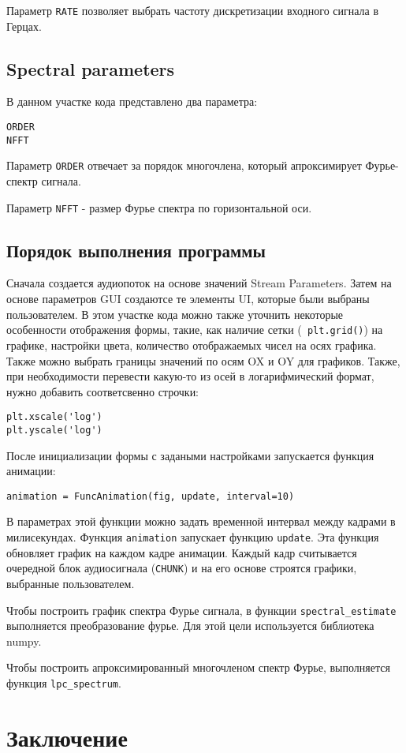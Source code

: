 Параметр \verb|RATE| позволяет выбрать частоту дискретизации входного сигнала в Герцах.

\subsection{Spectral parameters}
В данном участке кода представлено два параметра:
\begin{verbatim}
ORDER
NFFT
\end{verbatim}
Параметр \verb|ORDER| отвечает за порядок многочлена, который апроксимирует Фурье-спектр сигнала.

Параметр \verb|NFFT| - размер Фурье спектра по горизонтальной оси.
\subsection{Порядок выполнения программы}
Сначала создается аудиопоток на основе значений Stream Parameters. Затем на основе параметров GUI создаютсе те элементы UI, которые были выбраны пользователем. В этом участке кода можно также уточнить некоторые особенности отображения формы, такие, как наличие сетки (\verb| plt.grid()|) на графике, настройки цвета, количество отображаемых чисел на осях графика. Также можно выбрать границы значений по осям OX и OY для графиков. Также, при необходимости перевести какую-то из осей в логарифмический формат, нужно добавить  соответсвенно строчки:
\begin{verbatim}
plt.xscale('log')
plt.yscale('log')
\end{verbatim}

После инициализации формы с задаными настройками запускается функция анимации: 
\begin{verbatim}
animation = FuncAnimation(fig, update, interval=10)
\end{verbatim}
В параметрах этой функции можно задать временной интервал между кадрами в милисекундах. Функция \verb|animation| запускает функцию \verb|update|. Эта функция обновляет график на каждом кадре анимации. Каждый кадр считывается очередной блок аудиосигнала (\verb|CHUNK|) и на его основе строятся графики, выбранные пользователем. 

Чтобы построить график спектра Фурье сигнала, в функции \verb|spectral_estimate| выполняется преобразование фурье. Для этой цели используется библиотека numpy.

Чтобы построить апроксимированный многочленом спектр Фурье, выполняется функция \verb|lpc_spectrum|.

\section{Заключение}
\newpage

